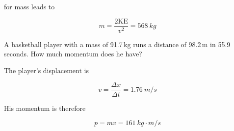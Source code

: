 \documentclass[answers]{exam}
\begin{document}
\begin{questions}
\begin{solution}
for mass leads to

\begin{equation*}
    m = \frac{2\mathrm{KE}}{v^2} = \boxed{\SI{568}{kg}}
\end{equation*}
\end{solution}









\question %
A basketball player with a mass of 91.7\,kg runs a distance of 98.2\,m in 55.9 seconds.  How much momentum does he have?

\begin{solution}
The player's displacement is

\begin{equation*}
    v = \frac{\Delta x}{\Delta t} = {\SI{1.76}{m/s}}
\end{equation*}

His momentum is therefore

\begin{equation*}
    p = mv = \boxed{\SI{161}{kg\cdot m/s}}
\end{equation*}
\end{solution}




\end{questions}
\end{document}
